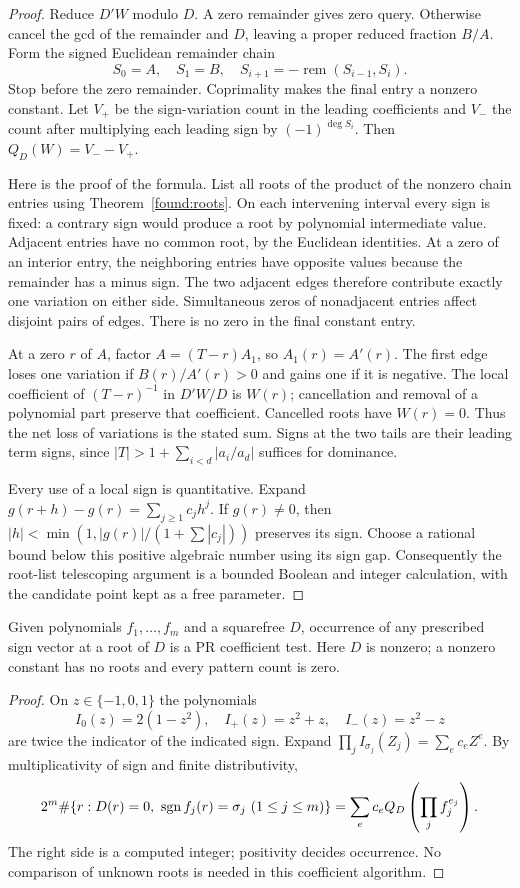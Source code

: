 \begin{proof}
Reduce $D'W$ modulo $D$. A zero remainder gives zero query. Otherwise
cancel the gcd of the remainder and $D$, leaving a proper reduced fraction
$B/A$. Form the signed Euclidean remainder chain
\[
 S_0=A,\quad S_1=B,\quad S_{i+1}=-\operatorname{rem}(S_{i-1},S_i).
\]
Stop before the zero remainder. Coprimality makes the final entry a
nonzero constant. Let $V_+$ be the sign-variation count in the leading
coefficients and $V_-$ the count after multiplying each leading sign by
$(-1)^{\deg S_i}$. Then $Q_D(W)=V_--V_+$.

Here is the proof of the formula. List all roots of the product of the
nonzero chain entries using Theorem~\ref{found:roots}. On each intervening
interval every sign is fixed: a contrary sign would produce a root by
polynomial intermediate value. Adjacent entries have no common root,
by the Euclidean identities. At a zero of an interior entry, the
neighboring entries have opposite values because the remainder has a
minus sign. The two adjacent edges therefore contribute exactly one
variation on either side. Simultaneous zeros of nonadjacent entries affect
disjoint pairs of edges. There is no zero in the final constant entry.

At a zero $r$ of $A$, factor $A=(T-r)A_1$, so $A_1(r)=A'(r)$.
The first edge loses one variation if $B(r)/A'(r)>0$ and gains one
if it is negative. The local coefficient of $(T-r)^{-1}$ in $D'W/D$
is $W(r)$; cancellation and removal of a polynomial part preserve that
coefficient. Cancelled roots have $W(r)=0$. Thus the net loss of
variations is the stated sum. Signs at the two tails are their leading
term signs, since $|T|>1+\sum_{i<d}|a_i/a_d|$ suffices for dominance.

Every use of a local sign is quantitative. Expand
$g(r+h)-g(r)=\sum_{j\ge1}c_jh^j$. If $g(r)\ne0$, then
$|h|<\min(1,|g(r)|/(1+\sum|c_j|))$ preserves its sign. Choose a
rational bound below this positive algebraic number using its sign gap.
Consequently the root-list telescoping argument is a bounded Boolean
and integer calculation, with the candidate point kept as a free parameter.
\end{proof}

\begin{lemma}\label{qe:patterns}
Given polynomials $f_1,\ldots,f_m$ and a squarefree $D$, occurrence of
any prescribed sign vector at a root of $D$ is a PR coefficient test.
Here $D$ is nonzero; a nonzero constant has no roots and every pattern
count is zero.
\end{lemma}
\begin{proof}
On $z\in\{-1,0,1\}$ the polynomials
\[
 I_0(z)=2(1-z^2),\quad I_+(z)=z^2+z,\quad I_-(z)=z^2-z
\]
are twice the indicator of the indicated sign. Expand
$\prod_j I_{\sigma_j}(Z_j)=\sum_e c_eZ^e$. By multiplicativity of
sign and finite distributivity,
\[
 2^m\#\{r:D(r)=0,\ \operatorname{sgn} f_j(r)=\sigma_j\ (1\le j\le m)\}
   =\sum_e c_e Q_D\left(\prod_j f_j^{e_j}\right).
\]
The right side is a computed integer; positivity decides occurrence.
No comparison of unknown roots is needed in this coefficient algorithm.
\end{proof}

